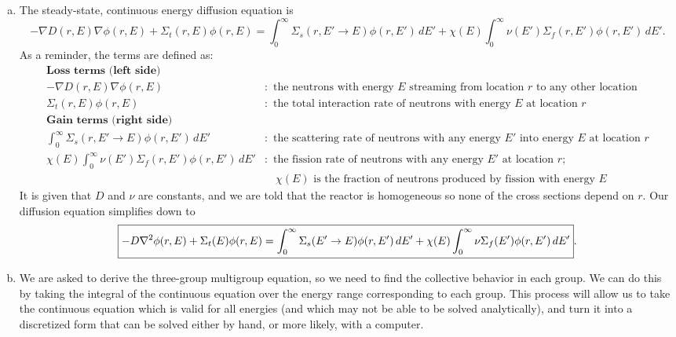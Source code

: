 \documentclass{report}
\begin{document}
\begin{enumerate}[a)]

\item 

The steady-state, continuous energy diffusion equation is
$$ -\nabla D(r,E) \nabla \phi(r,E) + \Sigma_t(r,E) \phi(r,E) = \int_0^{\infty} \Sigma_s(r,E' \rightarrow E)\phi(r,E')\,dE' + \chi(E) \int_0^{\infty} \nu(E') \Sigma_f(r,E')\phi(r,E')\,dE' .$$
As a reminder, the terms are defined as:
\begin{align*}
\textbf{Loss terms (left side)} \qquad\qquad& \\
-\nabla D(r,E) \nabla \phi(r,E)&:\text{ the neutrons with energy }E\text{ streaming from location }r\text{ to any other location} \\
\Sigma_t(r,E) \phi(r,E)&:\text{ the total interaction rate of neutrons with energy }E\text{ at location }r  \\
\textbf{Gain terms (right side)} \qquad\qquad& \\
\int_0^{\infty} \Sigma_s(r,E' \rightarrow E)\phi(r,E')\,dE'&:\text{ the scattering rate of neutrons with any energy }E'\text{ into energy }E\text{ at location }r \\
\chi(E) \int_0^{\infty} \nu(E') \Sigma_f(r,E')\phi(r,E')\,dE'&:\text{ the fission rate of neutrons with any energy }E'\text{ at location }r; \\
& \quad\chi(E)\text{ is the fraction of neutrons produced by fission with energy }E
\end{align*}
It is given that $D$ and $\nu$ are constants, and we are told that the reactor is homogeneous so none of the cross sections depend on $r$. Our diffusion equation simplifies down to
$$\boxed{ -D \nabla^2 \phi(r,E) + \Sigma_t(E) \phi(r,E) = \int_0^{\infty} \Sigma_s(E' \rightarrow E)\phi(r,E')\,dE' + \chi(E) \int_0^{\infty} \nu \Sigma_f(E')\phi(r,E')\,dE' }.$$

\item

We are asked to derive the three-group multigroup equation, so we need to find the collective behavior in each group. We can do this by taking the integral of the continuous equation over the energy range corresponding to each group. This process will allow us to take the continuous equation which is valid for all energies (and which may not be able to be solved analytically), and turn it into a discretized form that can be solved either by hand, or more likely, with a computer.


\end{enumerate}
\end{document}
